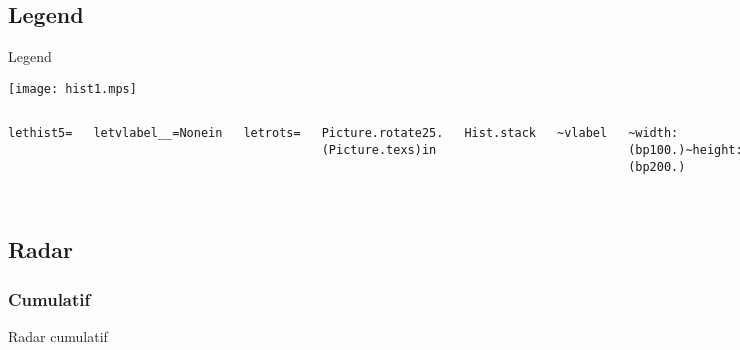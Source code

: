 \documentclass{beamer}
\begin{document}
\subsection{Legend}
\begin{frame}{Legend}
  \begin{center}
    \texttt{[image: hist1.mps]}
  \end{center}
  \begin{columns}
    \begin{alltt}
      \footnotesize{let hist5 =
      
      let vlabel \_ \_ = None in
      
      let rot s = 

      Picture.rotate 25. (Picture.tex s) in
      
      Hist.stack
      
      \textasciitilde vlabel 

      \textasciitilde width:(bp 100.) \textasciitilde height:(bp 200.)
      
      \textasciitilde perspective:true ~padding:(bp 15.)
      
      \textasciitilde fill:[lightred;lightblue;

      lightyellow;lightgreen]
      
      \textasciitilde histlabel:(`Center, Hist.Values)
      
      \textasciitilde vcaption:(Picture.tex "Dollars")

      \textasciitilde hlabel:[rot "2007";rot "2008";rot "2009"]
      [[4.;5.;5.;]; [8.;3.;1.]; [2.;8.;1.;4.]]}
    \end{alltt}
    \begin{center}
      \texttt{[image: hist5.mps]}
    \end{center}
  \end{columns}
\end{frame}

\subsection{Radar}
\subsubsection{Cumulatif}
\begin{frame}{Radar cumulatif}
\end{frame}
\end{document}
